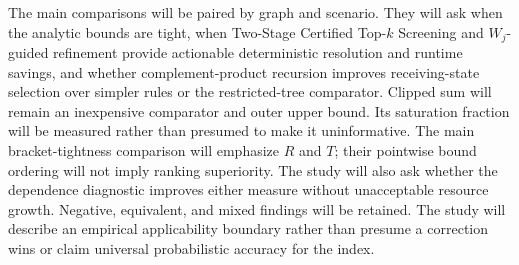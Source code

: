The main comparisons will be paired by graph and scenario. They will ask
when the analytic bounds are tight, when Two-Stage Certified Top-$k$
Screening and $W_j$-guided refinement provide actionable deterministic
resolution and runtime savings, and whether complement-product recursion
improves receiving-state selection over simpler rules or the restricted-tree
comparator. Clipped sum will remain an inexpensive comparator and outer upper bound.
Its saturation fraction will be measured rather than presumed to make it
uninformative. The main bracket-tightness comparison will emphasize $R$
and $T$; their pointwise bound ordering will not imply ranking superiority. The study will also ask whether the dependence diagnostic
improves either measure without unacceptable resource growth. Negative,
equivalent, and mixed findings will be retained. The study will describe
an empirical applicability boundary rather than presume a correction wins
or claim universal probabilistic accuracy for the index.
